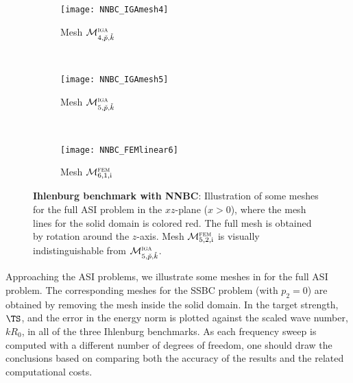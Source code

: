 \begin{figure}
	\centering
	\begin{subfigure}{0.3\textwidth}
		\centering
		\texttt{[image: NNBC\_IGAmesh4]}
		\caption{Mesh ${\cal M}_{4,\check{p},\check{k}}^{\textsc{iga}}$}
		\label{Fig2:SphericalShellMeshes1NNBC}
    \end{subfigure}
    ~
	\begin{subfigure}{0.3\textwidth}
		\centering
		\texttt{[image: NNBC\_IGAmesh5]}
		\caption{Mesh ${\cal M}_{5,\check{p},\check{k}}^{\textsc{iga}}$}
		\label{Fig2:SphericalShellMeshes2NNBC}
    \end{subfigure}
    ~
	\begin{subfigure}{0.3\textwidth}
		\centering
		\texttt{[image: NNBC\_FEMlinear6]}
		\caption{Mesh ${\cal M}_{6,1,\mathrm{i}}^{\textsc{fem}}$}
		\label{Fig2:SphericalShellMeshes3NNBC}
    \end{subfigure}
	\caption{\textbf{Ihlenburg benchmark with NNBC}: Illustration of some meshes for the full ASI problem in the $xz$-plane ($x>0$), where the mesh lines for the solid domain is colored red. The full mesh is obtained by rotation around the $z$-axis. Mesh ${\cal M}_{5,2,\mathrm{i}}^{\textsc{fem}}$ is visually indistinguishable from ${\cal M}_{5,\check{p},\check{k}}^{\textsc{iga}}$.}
	\label{Fig2:SphericalShellMeshesNNBC}
\end{figure}
Approaching the ASI problems, we illustrate some meshes in  for the full ASI problem. The corresponding meshes for the SSBC problem (with $p_2=0$) are obtained by removing the mesh inside the solid domain. In  the target strength, $\TS$, and the error in the energy norm is plotted against the scaled wave number, $kR_0$, in all of the three Ihlenburg benchmarks. As each frequency sweep is computed with a different number of degrees of freedom, one should draw the conclusions based on comparing both the accuracy of the results and the related computational costs.

